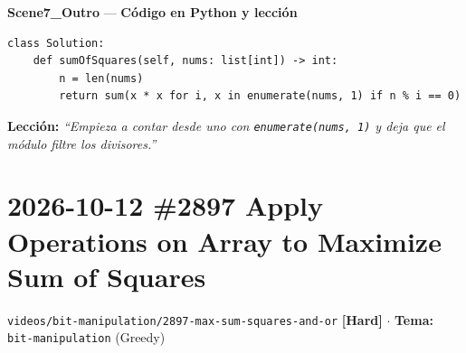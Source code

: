 \documentclass[letterpaper,10pt]{article}
\newcommand{\scene}[2]{\noindent\textbf{\textcolor{mcaqua}{#1}} --- \textbf{#2}\par\vspace{1pt}}
\newcommand{\folder}[1]{\texttt{\textcolor{mcgreen}{#1}}}
\newcommand{\badge}[2]{\textbf{\textcolor{#1}{[#2]}}}
\begin{document}
\scene{Scene7\_Outro}{C\'odigo en Python y lecci\'on}
\begin{Verbatim}[frame=single,fontsize=\small]
class Solution:
    def sumOfSquares(self, nums: list[int]) -> int:
        n = len(nums)
        return sum(x * x for i, x in enumerate(nums, 1) if n % i == 0)
\end{Verbatim}
\textbf{Lecci\'on:} \textit{``Empieza a contar desde uno con \texttt{enumerate(nums, 1)} y deja que el m\'odulo filtre los divisores.''}

\newpage

\section{2026-10-12 \textbar{} \#2897 Apply Operations on Array to Maximize Sum of Squares}
\folder{videos/bit-manipulation/2897-max-sum-squares-and-or} \hfill \badge{mcred}{Hard} $\cdot$ \textbf{Tema:} \texttt{bit-manipulation} (Greedy)
\end{document}
